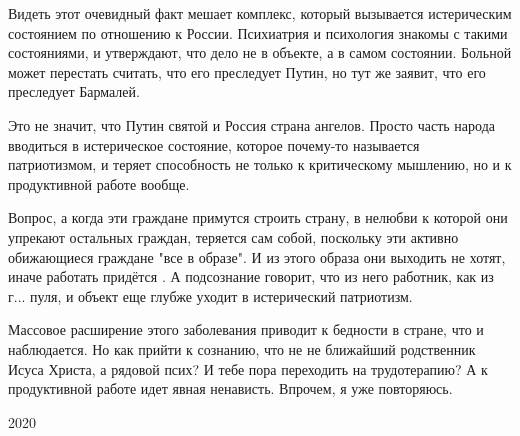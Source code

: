 Видеть этот очевидный факт мешает комплекс, который вызывается истерическим
состоянием по отношению к России. Психиатрия и психология знакомы с такими
состояниями, и утверждают, что дело не в объекте, а в самом состоянии. Больной
может перестать считать, что его преследует Путин, но тут же заявит, что его
преследует Бармалей. 

Это не значит, что Путин святой и Россия страна ангелов. Просто часть народа
вводиться в истерическое состояние, которое почему-то называется патриотизмом,
и теряет способность не только к критическому мышлению, но и к продуктивной
работе вообще. 

Вопрос, а когда эти граждане примутся строить страну, в нелюбви к которой они
упрекают остальных граждан, теряется сам собой, поскольку эти активно
обижающиеся граждане "все в образе". И из этого образа они выходить не хотят,
иначе работать придётся . А подсознание говорит, что из него работник, как из
г... пуля, и объект еще глубже уходит в истерический патриотизм. 

Массовое расширение этого заболевания приводит к бедности в стране, что и
наблюдается. Но как прийти к сознанию, что не не ближайший родственник Исуса
Христа, а рядовой псих? И тебе пора переходить на трудотерапию? А к
продуктивной работе идет явная ненависть. Впрочем, я уже повторяюсь.

2020
